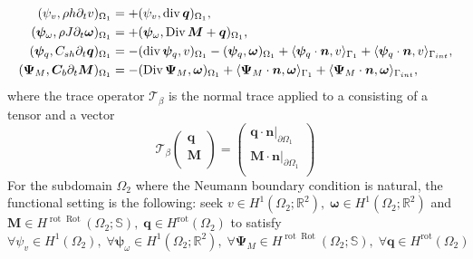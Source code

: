 \documentclass[11pt,a4paper]{article}
\newcommand{\bbR}{\mathbb{R}}
\renewcommand{\div}{\operatorname{div}}
\DeclareMathOperator*{\Div}{Div}
\DeclareMathOperator*{\rot}{rot}
\DeclareMathOperator*{\Rot}{Rot}
\newcommand{\innerproduct}[3][\Omega]{(#2, #3)_{#1}}
\newcommand{\boundary}[3][\partial\Omega]{\langle #2, #3\rangle_{#1}}
\begin{document}
\begin{equation}
    \begin{split}
    \begin{alignedat}{2}
        \innerproduct[\Omega_1]{\psi_v}{\rho h \partial_t v} &= + \innerproduct[\Omega_1]{\psi_v}{\div\bm{q}}, \\
        \innerproduct[\Omega_1]{\bm\psi_\omega}{\rho J \partial_t \bm{\omega}} &= + \innerproduct[\Omega_1]{\bm\psi_\omega}{\Div\bm{M} + \bm{q}}, \\
        \innerproduct[\Omega_1]{\bm{\psi}_q}{C_{\rm sh}\partial_t\bm{q}} &=- \innerproduct[\Omega_1]{\div\bm{\psi}_q}{v} - \innerproduct[\Omega_1]{\bm{\psi}_q}{\bm{\omega}} + \boundary[\Gamma_1]{\bm{\psi}_q \cdot \bm{n}}{v} + \boundary[\Gamma_{\rm int}]{\bm{\psi}_q \cdot \bm{n}}{v}, \\
        \innerproduct[\Omega_1]{\bm{\Psi}_M}{\bm{C}_b\partial_t\bm{M}} &=- \innerproduct[\Omega_1]{\Div\bm{\Psi}_M}{\bm{\omega}} + \boundary[\Gamma_1]{\bm{\Psi}_M \cdot \bm{n}}{\bm{\omega}} + \boundary[\Gamma_{\rm int}]{\bm{\Psi}_M \cdot \bm{n}}{\bm{\omega}}, \\
    \end{alignedat}
    \end{split}
\label{eq:Mindlin-weak-D}
\end{equation}
where the trace operator $\mathcal{T}_\beta$ is the normal trace applied to a consisting of a tensor and a vector
$$
\mathcal{T}_\beta \begin{pmatrix}
    \bm{q} \\
    \bm{M} \\
\end{pmatrix} = 
\begin{pmatrix}
    \bm{q}\cdot \bm{n}\vert_{\partial\Omega_1} \\
    \bm{M}\cdot \bm{n}\vert_{\partial\Omega_1} \\
\end{pmatrix}
$$
For the subdomain $\Omega_2$ where the Neumann boundary condition is natural, the functional setting is the following: seek $v \in H^1(\Omega_2; \mathbb{R}^2), \;  \bm{\omega}\in H^1(\Omega_2; \mathbb{R}^2)$ and $\bm{M}\in H^{\rot\Rot}(\Omega_2; \mathbb{S}), \; \bm{q}\in H^{\rot}(\Omega_2)$ to satisfy $\forall\psi_v \in H^1(\Omega_2), \; \forall\bm\psi_\omega \in H^1(\Omega_2; \bbR^2), \; \forall\bm{\Psi}_M\in H^{\rot\Rot}(\Omega_2; \mathbb{S}), \; \forall\bm{q}\in H^{\rot}(\Omega_2)$
\end{document}
